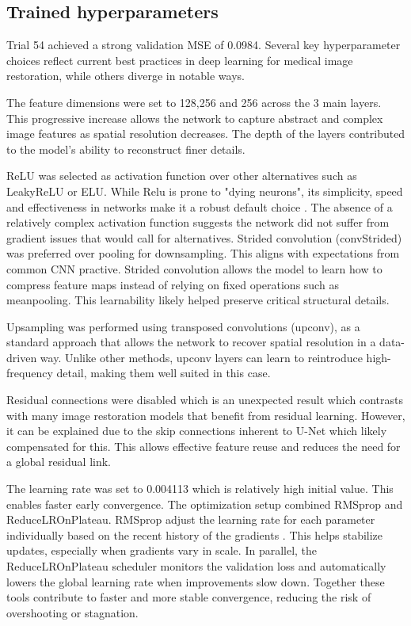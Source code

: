 \documentclass[twocolumn]{article}
\begin{document}
\subsection{Trained hyperparameters}
Trial 54 achieved a strong validation MSE of 0.0984. 
Several key hyperparameter choices reflect current best practices in deep learning for medical image restoration, while others diverge in notable ways. 

The feature dimensions were set to 128,256 and 256 across the 3 main layers. 
This progressive increase allows the network to capture abstract and complex image features as spatial resolution decreases. 
The depth of the layers contributed to the model's ability to reconstruct finer details.

ReLU was selected as activation function over other alternatives such as LeakyReLU or ELU. 
While Relu is prone to "dying neurons", its simplicity, speed and effectiveness in networks make it a robust default choice \cite{relu}. 
The absence of a relatively complex activation function suggests the network did not suffer from gradient issues that would call for alternatives. 
Strided convolution (convStrided) was preferred over pooling for downsampling. 
This aligns with expectations from common CNN practive. 
Strided convolution allows the model to learn how to compress feature maps instead of relying on fixed operations such as meanpooling. 
This learnability likely helped preserve critical structural details. 

Upsampling was performed using transposed convolutions (upconv), as a standard approach that allows the network to recover spatial resolution in a data-driven way. 
Unlike other methods, upconv layers can learn to reintroduce high-frequency detail, making them well suited in this case.

Residual connections were disabled which is an unexpected result which contrasts with many image restoration models that benefit from residual learning. 
However, it can be explained due to the skip connections inherent to U-Net which likely compensated for this. 
This allows effective feature reuse and reduces the need for a global residual link.

The learning rate was set to 0.004113 which is relatively high initial value. This enables faster early convergence. 
The optimization setup combined RMSprop and ReduceLROnPlateau. 
RMSprop adjust the learning rate for each parameter individually based on the recent history of the gradients \cite{9036442}. 
This helps stabilize updates, especially when gradients vary in scale. 
In parallel, the ReduceLROnPlateau scheduler monitors the validation loss and automatically lowers the global learning rate when improvements slow down. 
Together these tools contribute to faster and more stable convergence, reducing the risk of overshooting or stagnation.
\end{document}
